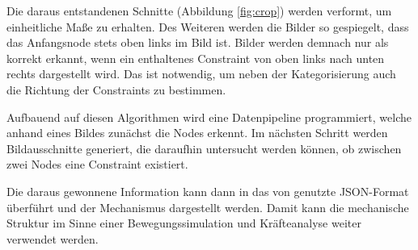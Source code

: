 Die daraus entstandenen Schnitte (Abbildung \ref{fig:crop}) werden verformt, um einheitliche Ma{\ss}e zu erhalten.
Des Weiteren werden die Bilder so gespiegelt, dass das Anfangsnode stets oben links im Bild ist.
Bilder werden demnach nur als korrekt erkannt, wenn ein enthaltenes Constraint von oben links nach unten rechts dargestellt wird.
Das ist notwendig, um neben der Kategorisierung auch die Richtung der Constraints zu bestimmen.

Aufbauend auf diesen Algorithmen wird eine Datenpipeline programmiert, welche anhand eines Bildes zunächst die Nodes erkennt.
Im nächsten Schritt werden Bildausschnitte generiert, die daraufhin untersucht werden können, ob zwischen zwei Nodes eine Constraint existiert.

Die daraus gewonnene Information kann dann in das von  genutzte JSON-Format überführt und der Mechanismus dargestellt werden.
Damit kann die mechanische Struktur im Sinne einer Bewegungssimulation und Kräfteanalyse weiter verwendet werden.
